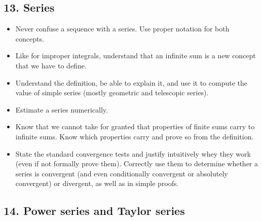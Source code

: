\documentclass[11pt]{article}
\begin{document}
	\subsection{13. Series}

	\begin{itemize}
		\item Never confuse a sequence with a series. Use proper notation for both
			concepts.

		\item Like for improper integrals, understand that an infinite sum is a new
			concept that we have to define.

		\item Understand the definition, be able to explain it, and use it to compute
			the value of simple series (mostly geometric and telescopic series).

		\item Estimate a series numerically.

		\item Know that we cannot take for granted that properties of finite sums carry
			to infinite sums. Know which properties carry and prove so from the
			definition.

		\item State the standard convergence tests and justify intuitively whey they
			work (even if not formally prove them). Correctly use them to determine
			whether a series is convergent (and even conditionally convergent or absolutely
			convergent) or divergent, as well as in simple proofs.
	\end{itemize}

	\subsection{14. Power series and Taylor series}
\end{document}
